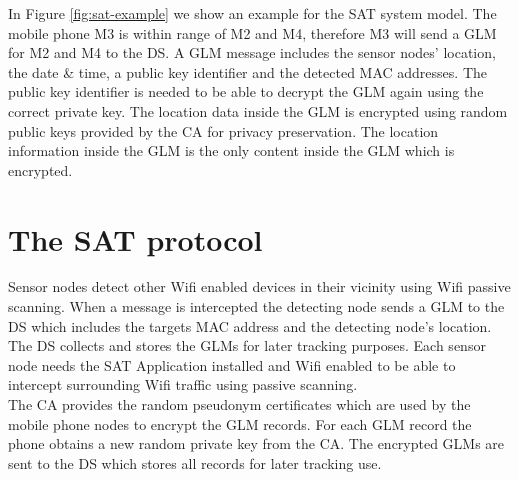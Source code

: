 \documentclass[10pt,titlepage]{article}
\begin{document}
In Figure \ref{fig:sat-example} we show an example for the SAT system model. The mobile phone M3 is within range of M2 and M4, therefore M3 will send a GLM for M2 and M4 to the DS. A GLM message includes the sensor nodes' location, the date \& time, a public key identifier and the detected MAC addresses. The public key identifier is needed to be able to decrypt the GLM again using the correct private key. The location data inside the GLM is encrypted using random public keys provided by the CA for privacy preservation. The location information inside the GLM is the only content inside the GLM which is encrypted.



\section{The SAT protocol}
Sensor nodes detect other Wifi enabled devices in their vicinity using Wifi passive scanning. When a message is intercepted the detecting node sends a GLM to the DS which includes the targets MAC address and the detecting node's location. The DS collects and stores the GLMs for later tracking purposes. Each sensor node needs the SAT Application installed and Wifi enabled to be able to intercept surrounding Wifi traffic using passive scanning.\\



The CA provides the random pseudonym certificates which are used by the mobile phone nodes to encrypt the GLM records. For each GLM record the phone obtains a new random private key from the CA. The encrypted GLMs are sent to the DS which stores all records for later tracking use. \\

\end{document}
